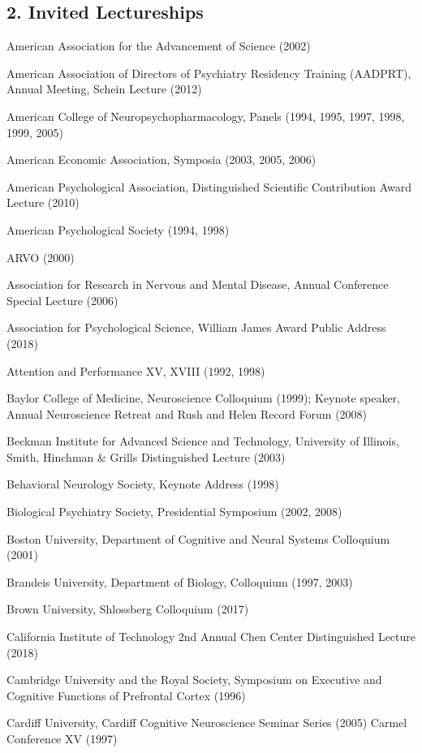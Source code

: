 \documentclass[10 pt]{article}
\begin{document}
\subsection*{2. Invited Lectureships} \label{secRAPA2}

American Association for the Advancement of Science (2002)

American Association of Directors of Psychiatry Residency Training (AADPRT), Annual Meeting, Schein Lecture (2012)

American College of Neuropsychopharmacology, Panels (1994, 1995, 1997, 1998, 1999, 2005)

American Economic Association, Symposia (2003, 2005, 2006)

American Psychological Association, Distinguished Scientific Contribution Award Lecture (2010)

American Psychological Society (1994, 1998)

ARVO (2000)

Association for Research in Nervous and Mental Disease, Annual Conference Special Lecture (2006)

Association for Psychological Science, William James Award Public Address (2018)

Attention and Performance XV, XVIII (1992, 1998)

Baylor College of Medicine, Neuroscience Colloquium (1999); Keynote speaker, Annual Neuroscience Retreat and Rush and Helen Record Forum (2008)

Beckman Institute for Advanced Science and Technology, University of Illinois, Smith, Hinchman \& Grills Distinguished Lecture (2003)

Behavioral Neurology Society, Keynote Address (1998)

Biological Psychiatry Society, Presidential Symposium (2002, 2008)

Boston University, Department of Cognitive and Neural Systems Colloquium (2001)

Brandeis University, Department of Biology, Colloquium (1997, 2003)

Brown University, Shlossberg Colloquium (2017)

California Institute of Technology 2nd Annual Chen Center Distinguished Lecture (2018)

Cambridge University and the Royal Society, Symposium on Executive and Cognitive Functions of Prefrontal Cortex (1996)

Cardiff University, Cardiff Cognitive Neuroscience Seminar Series (2005)
Carmel Conference XV (1997)
\end{document}
